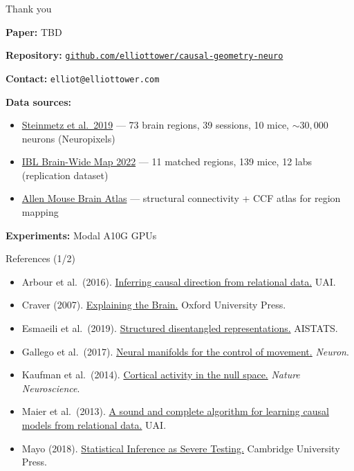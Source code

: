 \documentclass[aspectratio=169,11pt]{beamer}
\begin{document}
\begin{frame}{Thank you}

\textbf{Paper:} TBD

\vspace{0.3em}
\textbf{Repository:} \href{https://github.com/elliottower/causal-geometry-neuro}{\texttt{github.com/elliottower/causal-geometry-neuro}}

\vspace{0.3em}
\textbf{Contact:} \texttt{elliot@elliottower.com}

\vspace{0.3em}
{\small
\textbf{Data sources:}
\begin{itemize}\setlength\itemsep{0pt}
  \item \href{https://doi.org/10.1038/s41586-019-1787-x}{Steinmetz et al.\ 2019} --- 73 brain regions, 39 sessions, 10 mice, ${\sim}30{,}000$ neurons (Neuropixels)
  \item \href{https://int-brain-lab.github.io/}{IBL Brain-Wide Map 2022} --- 11 matched regions, 139 mice, 12 labs (replication dataset)
  \item \href{https://connectivity.brain-map.org/}{Allen Mouse Brain Atlas} --- structural connectivity + CCF atlas for region mapping
\end{itemize}

\textbf{Experiments:} Modal A10G GPUs
}
\end{frame}

\begin{frame}{References (1/2)}
\vspace{-0.3em}
{\scriptsize
\begin{itemize}\setlength\itemsep{0pt}
  \item Arbour et al.\ (2016). \href{https://www.auai.org/uai2016/proceedings/papers/217.pdf}{Inferring causal direction from relational data.} UAI.
  \item Craver (2007). \href{https://doi.org/10.1093/acprof:oso/9780199299317.001.0001}{Explaining the Brain.} Oxford University Press.
  \item Esmaeili et al.\ (2019). \href{https://proceedings.mlr.press/v89/esmaeili19a}{Structured disentangled representations.} AISTATS.
  \item Gallego et al.\ (2017). \href{https://doi.org/10.1038/nn.4510}{Neural manifolds for the control of movement.} \textit{Neuron}.
  \item Kaufman et al.\ (2014). \href{https://doi.org/10.1038/nn.3643}{Cortical activity in the null space.} \textit{Nature Neuroscience}.
  \item Maier et al.\ (2013). \href{https://arxiv.org/abs/1309.6843}{A sound and complete algorithm for learning causal models from relational data.} UAI.
  \item Mayo (2018). \href{https://doi.org/10.1017/9781107286184}{Statistical Inference as Severe Testing.} Cambridge University Press.
\end{itemize}
}
\end{frame}
\end{document}
